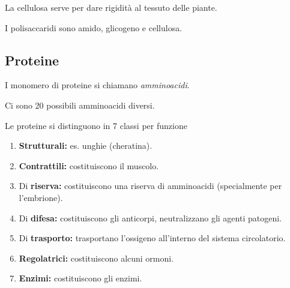 \documentclass[a4paper]{article}
\begin{document}

La cellulosa serve per dare rigidità al tessuto delle piante.

I polisaccaridi sono amido, glicogeno e cellulosa.


\pagebreak

\subsection{Proteine}

I monomero di proteine si chiamano \textit{amminoacidi}.


Ci sono 20 possibili amminoacidi diversi.



Le proteine si distinguono in 7 classi per funzione
\begin{enumerate}
    \item \textbf{Strutturali:} es. unghie (cheratina).

    \item \textbf{Contrattili:} costituiscono il muscolo.

    \item Di \textbf{riserva:} costituiscono una riserva di amminoacidi (specialmente per l'embrione).

    \item Di \textbf{difesa:} costituiscono gli anticorpi, neutralizzano gli agenti patogeni.
    
    \item Di \textbf{trasporto:} trasportano l'ossigeno all'interno del sistema circolatorio.

    \item \textbf{Regolatrici:} costituiscono alcuni ormoni.

    \item \textbf{Enzimi:} costituiscono gli enzimi.
\end{enumerate}
\end{document}
